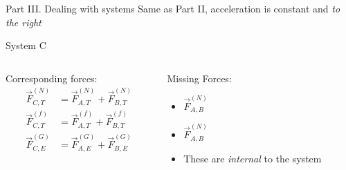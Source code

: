 \documentclass{beamer}
\begin{document}
\begin{frame}{Part \textrm{III}. Dealing with systems}
  Same as Part \textrm{II}, acceleration is constant and \textit{to the right}
  
  System C
  \begin{center}
  \end{center}
  \begin{columns}[t]
    \begin{column}{0.4\textwidth}
      Corresponding forces:
      \begin{align*}
        \vec{F}^{(N)}_{C,T} &= \vec{F}^{(N)}_{A,T} + \vec{F}^{(N)}_{B,T} \\
        \vec{F}^{(f)}_{C,T} &= \vec{F}^{(f)}_{A,T} + \vec{F}^{(f)}_{B,T} \\
        \vec{F}^{(G)}_{C,E} &= \vec{F}^{(G)}_{A,E} + \vec{F}^{(G)}_{B,E} \\
      \end{align*}
    \end{column}
    \begin{column}{0.5\textwidth}
      Missing Forces: 
      \begin{itemize}
        \item $\vec{F}^{(N)}_{A,B}$
        \item $\vec{F}^{(N)}_{A,B}$
        \item These are \textit{internal} to the system
      \end{itemize}
    \end{column}
  \end{columns}
\end{frame}
\end{document}
